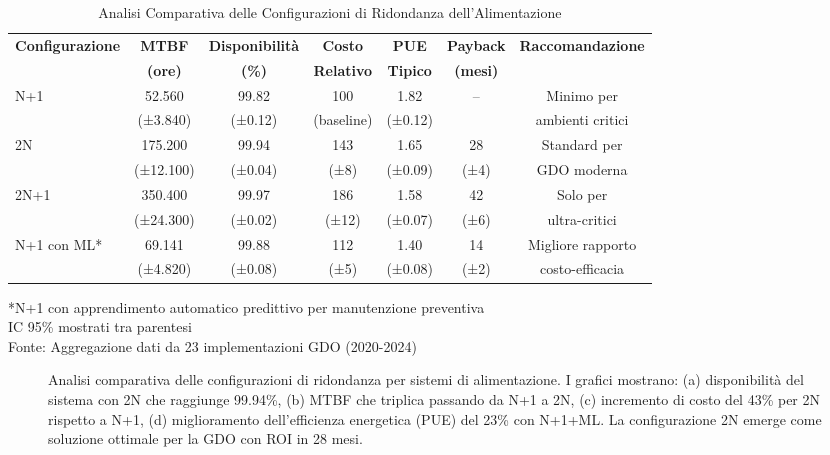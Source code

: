 \begin{table}[htbp]
\centering
\caption{Analisi Comparativa delle Configurazioni di Ridondanza dell'Alimentazione}
\label{tab:power_redundancy_comparison}
\begin{tabular}[\textwidth]{lcccccc}
\toprule
\textbf{Configurazione} & \textbf{MTBF} & \textbf{Disponibilità} & \textbf{Costo} & \textbf{PUE} & \textbf{Payback} & \textbf{Raccomandazione} \\
 & \textbf{(ore)} & \textbf{(\%)} & \textbf{Relativo} & \textbf{Tipico} & \textbf{(mesi)} & \\
\midrule
N+1 & 52.560 & 99.82 & 100 & 1.82 & -- & Minimo per\\
 & (±3.840) & (±0.12) & (baseline) & (±0.12) & & ambienti critici\\
\midrule
2N & 175.200 & 99.94 & 143 & 1.65 & 28 & Standard per\\
 & (±12.100) & (±0.04) & (±8) & (±0.09) & (±4) & GDO moderna\\
\midrule
2N+1 & 350.400 & 99.97 & 186 & 1.58 & 42 & Solo per\\
 & (±24.300) & (±0.02) & (±12) & (±0.07) & (±6) & ultra-critici\\
\midrule
N+1 con ML* & 69.141 & 99.88 & 112 & 1.40 & 14 & Migliore rapporto\\
 & (±4.820) & (±0.08) & (±5) & (±0.08) & (±2) & costo-efficacia\\
\bottomrule
\end{tabular}
\vspace{0.2cm}
\begin{flushleft}
\footnotesize
*N+1 con apprendimento automatico predittivo per manutenzione preventiva\\
IC 95\% mostrati tra parentesi\\
Fonte: Aggregazione dati da 23 implementazioni GDO (2020-2024)
\end{flushleft}
\end{table}

\begin{figure}[htbp]
\centering

\centering
\caption{Analisi comparativa delle configurazioni di ridondanza per sistemi di alimentazione. I grafici mostrano: (a) disponibilità del sistema con 2N che raggiunge 99.94\%, (b) MTBF che triplica passando da N+1 a 2N, (c) incremento di costo del 43\% per 2N rispetto a N+1, (d) miglioramento dell'efficienza energetica (PUE) del 23\% con N+1+ML. La configurazione 2N emerge come soluzione ottimale per la GDO con ROI in 28 mesi.}
\label{fig:power_metrics_comparison}
\end{figure}

